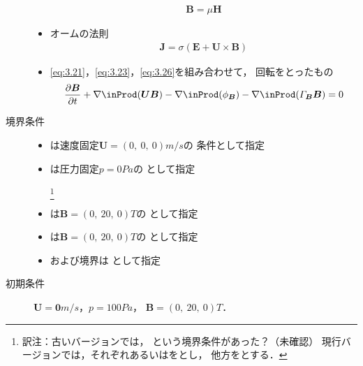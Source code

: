 \begin{description}
\begin{itemize}
                   \begin{align}
                    \label{eq:3.25}
                    \bm{B} = \mu\bm{H}
                   \end{align}
             \item オームの法則
                   \begin{align}
                    \label{eq:3.26}
                    \bm{J} = \sigma(\bm{E} + \bm{U} \times \bm{B})
                   \end{align}
             \item \autoref{eq:3.21}，\autoref{eq:3.23}，\autoref{eq:3.26}を組み合わせて，
                   回転をとったもの
                   \begin{align}
                    \label{eq:3.27}
                    \frac{\partial\bm{B}}{\partial t}
                    + \nabla \inProd (\bm{U}\bm{B})
                    - \nabla \inProd (\phi_{\bm{B}})
                    - \nabla \inProd (\varGamma_{\bm{B}}\bm{B}) = 0
                   \end{align}
            \end{itemize}
 \item[境界条件] \mbox{}
            \begin{itemize}
             \item {}は速度固定$\bm{U} = (0,\ 0,\ 0) \unit{m/s}$の
                   条件として指定%
\footnotemark
             \item {}は圧力固定$p = 0 \unit{Pa}$の
                   として指定
\addtocounter{footnote}{-1}
\footnote{訳注：古いバージョンでは，
という境界条件があった？（未確認）
現行バージョンでは，それぞれあるいはをとし，
他方をとする．}%
             \item {}は$\bm{B} = (0,\ 20,\ 0) \unit{T}$の
                   として指定
             \item {}は$\bm{B} = (0,\ 20,\ 0) \unit{T}$の
                   として指定
             \item {}および境界は
                   として指定
            \end{itemize}
 \item[初期条件] $\bm{U} = \bm{0} \unit{m/s}$，$p = 100 \unit{Pa}$，
            $\bm{B} = (0,\ 20,\ 0) \unit{T}$．

\end{description}
